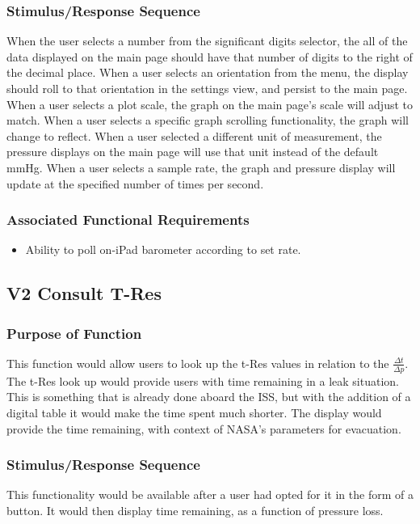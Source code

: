 \documentclass[onecolumn, draftclsnofoot,10pt, compsoc]{IEEEtran}
\begin{document}
\subsubsection{Stimulus/Response Sequence}
When the user selects a number from the significant digits selector, the all of the data displayed on the main page should have that number of digits to the right of the decimal place.
When a user selects an orientation from the menu, the display should roll to that orientation in the settings view, and persist to the main page.
When a user selects a plot scale, the graph on the main page's scale will adjust to match.
When a user selects a specific graph scrolling functionality, the graph will change to reflect.
When a user selected a different unit of measurement, the pressure displays on the main page will use that unit instead of the default mmHg.
When a user selects a sample rate, the graph and pressure display will update at the specified number of times per second.

\subsubsection{Associated Functional Requirements}
\begin{itemize}
\item Ability to poll on-iPad barometer according to set rate.
\end{itemize}

\subsection{V2 Consult T-Res}
\subsubsection{Purpose of Function}
This function would allow users to look up the t-Res values in relation to the $\frac{\Delta t}{\Delta p}$.
The t-Res look up would provide users with time remaining in a leak situation.
This is something that is already done aboard the ISS, but with the addition of a digital table it would make the time spent much shorter.
The display would provide the time remaining, with context of NASA's parameters for evacuation.
\subsubsection{Stimulus/Response Sequence}
This functionality would be available after a user had opted for it in the form of a button.
It would then display time remaining, as a function of pressure loss.
\end{document}
